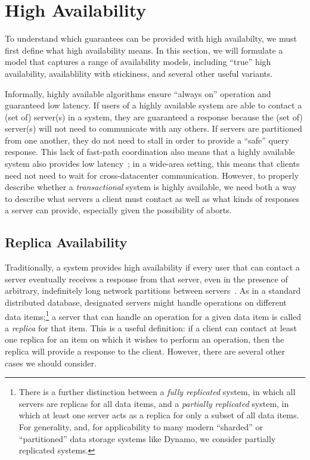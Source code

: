 
\section{High Availability}
\label{sec:availability}

To understand which guarantees can be provided with high availabilty,
we must first define what high availability means. In this section, we
will formulate a model that captures a range of availability models,
including ``true'' high availability, availablility with stickiness,
and several other useful variants.

Informally, highly available algorithms ensure ``always on'' operation
and guaranteed low latency. If users of a highly available system are
able to contact a (set of) server(s) in a system, they are guaranteed
a response because the (set of) server(s) will not need to communicate
with any others. If servers are partitioned from one another, they do
not need to stall in order to provide a ``safe'' query response. This
lack of fast-path coordination also means that a highly available
system also provides low latency~\cite{abadi-pacelc}; in a wide-area
setting, this means that clients need not need to wait for
cross-datacenter communication. However, to properly describe whether
a \textit{transactional} system is highly available, we need both a
way to describe what servers a client must contact as well as what
kinds of responses a server can provide, especially given the
possibility of aborts.

\subsection{Replica Availability}

Traditionally, a system provides high availability if every user that
can contact a server eventually receives a response from that server,
even in the presence of arbitrary, indefinitely long network
partitions between servers~\cite{gilbert-cap}. As in a standard
distributed database, designated servers might handle operations on
different data items;\footnote{There is a further distinction between
  a \textit{fully replicated} system, in which all servers are
  replicas for all data items, and a \textit{partially replicated}
  system, in which at least one server acts as a replica for only a
  subset of all data items. For generality, and, for applicability to
  many modern ``sharded'' or ``partitioned'' data storage systems like
  Dynamo, we consider partially replicated systems.} a server that can
handle an operation for a given data item is called a \textit{replica}
for that item. This is a useful definition: if a client can contact at
least one replica for an item on which it wishes to perform an
operation, then the replica will provide a response to the
client. However, there are several other cases we should consider.

